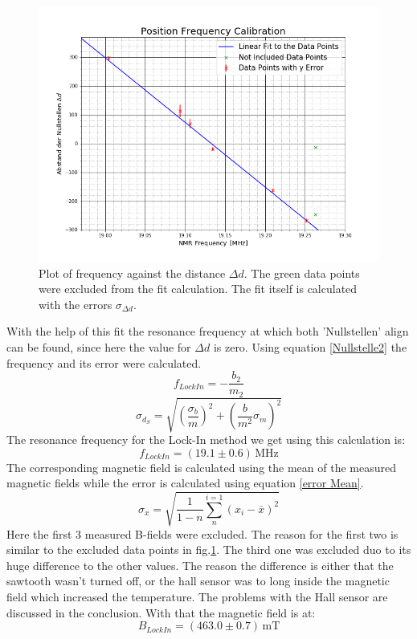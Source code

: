 \begin{figure}[h]
	\includegraphics[scale=0.5]{Bild/Eichung.png}
	\centering
	\caption{Plot of frequency against the distance $\Delta d$. The green data points were excluded from the fit calculation. The fit itself is calculated with the errors $\sigma_{\Delta d}$.}
	\label{Nullstellenfit}
\end{figure}
With the help of this fit the resonance frequency at which both 'Nullstellen' align can be found, since here the value for $\Delta d$ is zero. Using equation \ref{Nullstelle2} the frequency and its error were calculated.
\begin{equation}
f_{LockIn}=-\frac{b_2}{m_2}
\label{Nullstelle2}
\end{equation}
\begin{equation}
\sigma_{d_S}=\sqrt{(\frac{\sigma_{b}}{m})^2+(\frac{b}{m^2}\sigma_{m})^2}
\end{equation}
The resonance frequency for the Lock-In method we get using this calculation is:$$f_{LockIn}=(19.1\pm0.6)\,\text{MHz}$$
The corresponding magnetic field is calculated using the mean of the measured magnetic fields while the error is calculated using equation \ref{error Mean}.
\begin{equation}
	\sigma_x=\sqrt{\frac{1}{1-n}\sum_{n}^{i=1}(x_i-\bar{x})^2}
	\label{error Mean}
\end{equation}
Here the first 3 measured B-fields were excluded. The reason for the first two is similar to the excluded data points in fig.\ref{Nullstellenfit}. The third one was excluded duo to its huge difference to the other values. The reason the difference is either that the sawtooth wasn't turned off, or the hall sensor was to long inside the magnetic field which increased the temperature. The problems with the Hall sensor are discussed in the conclusion. With that the magnetic field is at:
$$B_{LockIn} = (463.0\pm0.7)\,\text{mT}$$